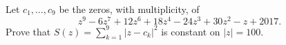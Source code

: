 Let $c_1,\ldots,c_9$ be the zeros, with multiplicity, of
\[
z^9-6z^7+12z^6+18z^4-24z^3+30z^2-z+2017.
\]
Prove that $S(z)=\sum_{k=1}^9|z-c_k|^2$ is constant on $|z|=100$.
